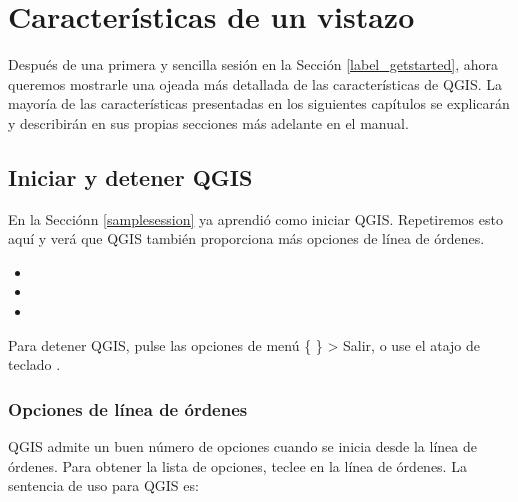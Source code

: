 
\section{Características de un vistazo}\label{feature_glance}


Después de una primera y sencilla sesión en la Sección \ref{label_getstarted}, ahora
queremos mostrarle una ojeada más detallada de las características de QGIS. 
La mayoría de las características presentadas en los siguientes capítulos se explicarán
y describirán en sus propias secciones más adelante en el manual.

\subsection{Iniciar y detener QGIS}\label{label_startinqgis}

En la Secciónn \ref{samplesession} ya aprendió como iniciar QGIS. Repetiremos
esto aquí y verá que QGIS también proporciona más opciones de línea de órdenes. 

\begin{itemize}
\item {}
\item {}
\item {}
\end{itemize} 

Para detener QGIS, pulse las opciones de menú \{\nix{} \} > Salir,
o use el atajo de teclado .

\subsubsection{Opciones de línea de órdenes}
\label{label_commandline}

\nix QGIS admite un buen número de opciones cuando se inicia desde la línea de 
órdenes. Para obtener la lista de opciones, teclee  en la
línea de órdenes.
La sentencia de uso para QGIS es:

